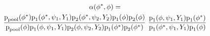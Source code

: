 \begin{multline*}
  \alpha (\phi^{*}, \phi) = \\ 
  \frac {
    \text{p}_{\text{pool}} (\phi^{*})
    \text{p}_{1}(\phi^{*}, \psi_{1}, Y_{1})
    \text{p}_{2}(\phi^{*}, \psi_{2}, Y_{2})
    \text{p}_{1}(\phi)
    \text{p}_{2}(\phi)
  } {
    \text{p}_{\text{pool}} (\phi)
    \text{p}_{1}(\phi, \psi_{1}, Y_{1})
    \text{p}_{2}(\phi, \psi_{2}, Y_{2})
    \text{p}_{1}(\phi^{*})
    \text{p}_{2}(\phi^{*})
  } \,\,
  \frac {
    \text{p}_{1}(\phi, \psi_{1}, Y_{1}) \text{p}_{1}(\phi^{*})
  } {
    \text{p}_{1}(\phi^{*}, \psi_{1}, Y_{1}) \text{p}_{1}(\phi)
  } 
\end{multline*}